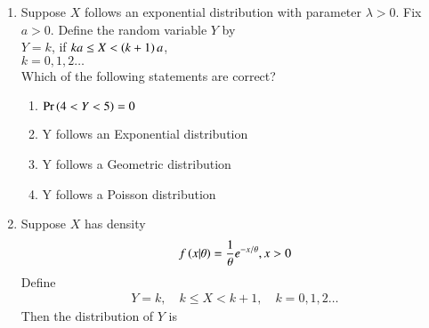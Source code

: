 \renewcommand{\theequation}{\theenumi}
\renewcommand{\thefigure}{\theenumi}
\renewcommand{\thetable}{\theenumi}
\begin{enumerate}[label=\thesection.\arabic*.,ref=\thesection.\theenumi]
\item Suppose $X$ follows an exponential distribution with parameter $\lambda>0$. Fix $a>0$. Define the random variable $Y$ by\\
$Y=k$, \qquad if $ka \leq X < \left(k+1\right)a$,\\
$k=0,1,2\ldots$\\
Which of the following statements are correct?
\begin{enumerate}
\setlength\itemsep{0.5em}
    \item $\Pr\left(4<Y<5\right)=0$
    \item Y follows an Exponential distribution
    \item Y follows a Geometric distribution
    \item Y follows a Poisson distribution
\end{enumerate}
\solution


\item Suppose $X$ has density 
%
\begin{align}
f\left(x|\theta\right) = \frac{1}{\theta}e^{-x/\theta}, x>0 
\end{align}
Define 
\begin{align}
    Y=k, \quad k\leq X< k+1, \quad k=0,1,2\ldots
\end{align}
%
Then the distribution of $Y$ is
\begin{enumerate}
\end{enumerate}
\solution




\end{enumerate}


